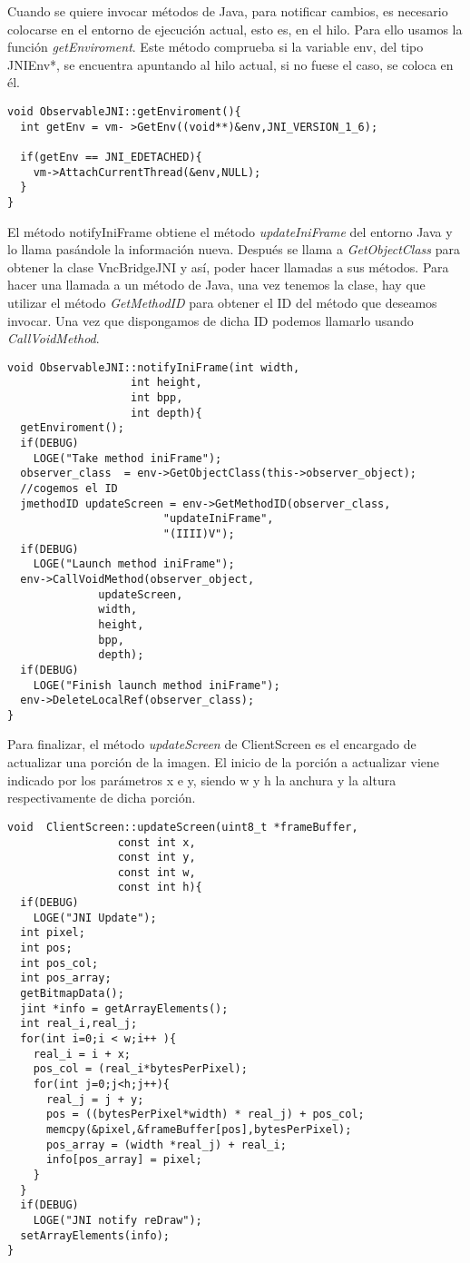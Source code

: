 Cuando se quiere invocar métodos de Java, para notificar cambios, es necesario colocarse en el entorno de ejecución actual, esto es, en el hilo. Para ello usamos la función \emph{getEnviroment}. Este método comprueba si la variable env, del tipo JNIEnv*, se encuentra apuntando al hilo actual, si no fuese el caso, se coloca en él.

\begin{lstlisting}
void ObservableJNI::getEnviroment(){
  int getEnv = vm- >GetEnv((void**)&env,JNI_VERSION_1_6);

  if(getEnv == JNI_EDETACHED){
    vm->AttachCurrentThread(&env,NULL);
  }
}
\end{lstlisting}

El método notifyIniFrame obtiene el método \emph{updateIniFrame} del entorno Java y lo llama pasándole la información nueva. Después se llama a \emph{GetObjectClass} para obtener la clase VncBridgeJNI y así, poder hacer llamadas a sus métodos. Para hacer una llamada a un método de Java, una vez tenemos la clase, hay que utilizar el método \emph{GetMethodID} para obtener el ID del método que deseamos invocar. Una vez que dispongamos de dicha ID podemos llamarlo usando \emph{CallVoidMethod}.
\begin{lstlisting}
void ObservableJNI::notifyIniFrame(int width,
				   int height,
				   int bpp,
				   int depth){
  getEnviroment();
  if(DEBUG)
    LOGE("Take method iniFrame");
  observer_class  = env->GetObjectClass(this->observer_object);
  //cogemos el ID
  jmethodID updateScreen = env->GetMethodID(observer_class,
					    "updateIniFrame",
					    "(IIII)V");
  if(DEBUG)
    LOGE("Launch method iniFrame");
  env->CallVoidMethod(observer_object,
		      updateScreen,
		      width,
		      height,
		      bpp,
		      depth);
  if(DEBUG)
    LOGE("Finish launch method iniFrame");
  env->DeleteLocalRef(observer_class);
}
\end{lstlisting}

Para finalizar, el método \emph{updateScreen} de ClientScreen es el encargado de actualizar una porción de la imagen. El inicio de la porción a actualizar viene indicado por los parámetros x e y, siendo w y h la anchura y la altura respectivamente de dicha porción.
\begin{lstlisting}
void  ClientScreen::updateScreen(uint8_t *frameBuffer,
				 const int x,
				 const int y,
				 const int w,
				 const int h){
  if(DEBUG)
    LOGE("JNI Update");
  int pixel;
  int pos;
  int pos_col;
  int pos_array;
  getBitmapData();
  jint *info = getArrayElements();
  int real_i,real_j;
  for(int i=0;i < w;i++ ){
    real_i = i + x;
    pos_col = (real_i*bytesPerPixel);
    for(int j=0;j<h;j++){
      real_j = j + y;
      pos = ((bytesPerPixel*width) * real_j) + pos_col;
      memcpy(&pixel,&frameBuffer[pos],bytesPerPixel);
      pos_array = (width *real_j) + real_i;
      info[pos_array] = pixel;
    }
  }
  if(DEBUG)
    LOGE("JNI notify reDraw");
  setArrayElements(info);
}
\end{lstlisting}


